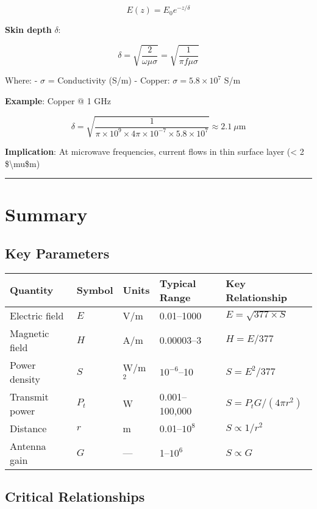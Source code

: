 \[
E(z) = E_0 e^{-z/\delta}
\]

\textbf{Skin depth} \(\delta\):

\[
\delta = \sqrt{\frac{2}{\omega \mu \sigma}} = \sqrt{\frac{1}{\pi f \mu \sigma}}
\]

Where: - \(\sigma\) = Conductivity (S/m) - Copper:
\(\sigma = 5.8 \times 10^7\) S/m

\textbf{Example}: Copper @ 1 GHz

\[
\delta = \sqrt{\frac{1}{\pi \times 10^9 \times 4\pi \times 10^{-7} \times 5.8 \times 10^7}} \approx 2.1\ \mu\text{m}
\]

\textbf{Implication}: At microwave frequencies, current flows in thin
surface layer (\textless{} 2 \$\textbackslash mu\$m)

\begin{center}\rule{0.5\linewidth}{0.5pt}\end{center}

\section{Summary}

\subsection{Key Parameters}

\begin{center}
\begin{tabular}{@{}lllll@{}}
\toprule
Quantity & Symbol & Units & Typical Range & Key Relationship \\
\midrule
Electric field & $E$ & V/m & 0.01--1000 & $E = \sqrt{377 \times S}$ \\
Magnetic field & $H$ & A/m & 0.00003--3 & $H = E/377$ \\
Power density & $S$ & W/m$^2$ & $10^{-6}$--10 & $S = E^2/377$ \\
Transmit power & $P_t$ & W & 0.001--100,000 & $S = P_t G / (4\pi r^2)$ \\
Distance & $r$ & m & 0.01--$10^8$ & $S \propto 1/r^2$ \\
Antenna gain & $G$ & --- & 1--$10^6$ & $S \propto G$ \\
\bottomrule
\end{tabular}
\end{center}

\subsection{Critical Relationships}

